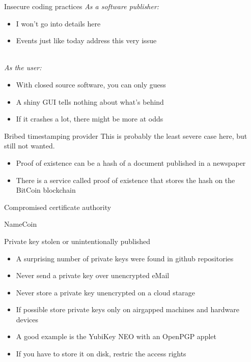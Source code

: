 \documentclass[11pt]{beamer}
\begin{document}
\begin{frame}{Insecure coding practices}
\emph{As a software publisher:}
\begin{itemize}
\item I won't go into details here
\item Events just like today address this very issue
\end{itemize}
\\[0.2cm]
\pause
\emph{As the user:}
\begin{itemize}
\item With closed source software, you can only guess
\item A shiny GUI tells nothing about what's behind
\item If it crashes a lot, there might be more at odds
\end{itemize}
\end{frame}

\begin{frame}{Bribed timestamping provider}
This is probably the least severe case here, but still not wanted.
\\[0.2cm]
\begin{itemize}
\item Proof of existence can be a hash of a document published in a newspaper
\item There is a service called proof of existence that stores the hash on the BitCoin blockchain
\end{itemize}
\end{frame}

\begin{frame}{Compromised certificate authority}
\end{frame}

\begin{frame}{NameCoin}
\end{frame}

\begin{frame}{Private key stolen or unintentionally published}
\begin{itemize}
\item A surprising number of private keys were found in github repositories
\item Never send a private key over unencrypted eMail %
\item Never store a private key unencrypted on a cloud starage
\item If possible store private keys only on airgapped machines and hardware devices
\item A good example is the YubiKey NEO with an OpenPGP applet
\item If you have to store it on disk, restric the access rights
\end{itemize}
\end{frame}
\end{document}
